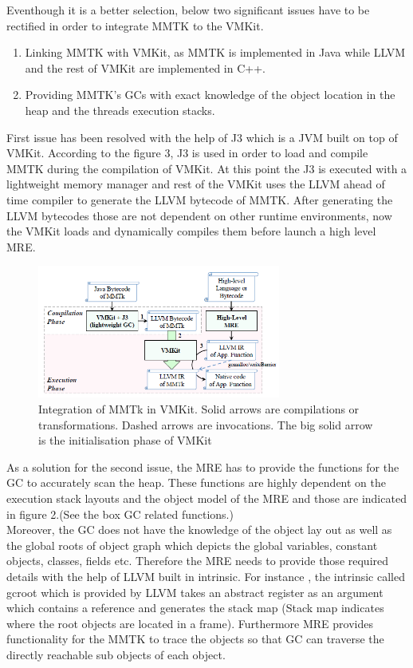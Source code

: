 Eventhough it is a better selection, below two significant issues have to be rectified in order to integrate MMTK to the VMKit.\\

\begin{enumerate}
 \item Linking MMTK with VMKit, as MMTK is implemented in Java while LLVM and the rest of VMKit are implemented in C++.
 \item Providing MMTK's GCs with exact knowledge of the object location in the heap and the threads execution stacks.
\end{enumerate}


First issue has been resolved with the help of J3 which is a JVM built on top of VMKit. According to the figure 3, J3 is used in order to load and compile MMTK during the compilation of VMKit. At this point the J3 is executed with a lightweight memory manager and rest of the VMKit uses the LLVM ahead of time compiler to generate the LLVM bytecode of MMTK. After generating the LLVM bytecodes those are not dependent on other runtime environments, now the VMKit loads and dynamically compiles them before launch a high level MRE.\\

\begin{figure}[ht!]
\centering
\includegraphics[width=80mm]{vmkitmmtk.png}
\caption{ Integration of MMTk in VMKit. Solid arrows are compilations or transformations. Dashed arrows are invocations. The big solid arrow is the initialisation phase of VMKit}
\label{fig:mmtk}
\end{figure}

As a solution for the second issue, the MRE has to provide the functions for the GC to accurately scan the heap. These functions are highly dependent on the execution stack layouts and the object model of the MRE and those are indicated in figure 2.(See the box GC related functions.) \\

Moreover, the GC does not have the knowledge of the object lay out as well as the global roots of object graph which depicts the global variables, constant objects, classes, fields etc. Therefore the MRE needs to provide those required details with the help of LLVM built in intrinsic. For instance , the intrinsic called gcroot which is provided by LLVM takes an abstract register as an argument which contains a reference and generates the stack map (Stack map indicates where the root objects are located in a frame). Furthermore MRE provides functionality for the MMTK to trace the objects so that GC can traverse the directly reachable sub objects of each object.\\

